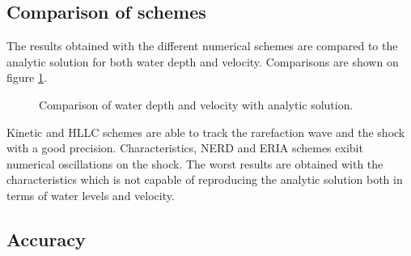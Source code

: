 \subsection{Comparison of schemes}

The results obtained with the different numerical schemes are compared to the analytic solution for both
water depth and velocity. Comparisons are shown on figure \ref{fig:stoker:comparison}.

\begin{figure}[H]
\begin{minipage}[t]{0.5\textwidth}
 \centering
\end{minipage}%
\begin{minipage}[t]{0.5\textwidth}
 \centering
\end{minipage}
\begin{minipage}[t]{0.5\textwidth}
 \centering
\end{minipage}%
\begin{minipage}[t]{0.5\textwidth}
 \centering
\end{minipage}
\begin{minipage}[t]{0.5\textwidth}
 \centering
\end{minipage}%
\begin{minipage}[t]{0.5\textwidth}
 \centering
\end{minipage}
  \caption{Comparison of water depth and velocity with analytic solution.}
  \label{fig:stoker:comparison}
\end{figure}

Kinetic and HLLC schemes are able to track the rarefaction wave and the shock with a good precision.
Characteristics, NERD and ERIA schemes exibit numerical oscillations on the shock.
The worst results are obtained with the characteristics which is not capable of reproducing the analytic solution both in terms of water levels and velocity.

\subsection{Accuracy}

